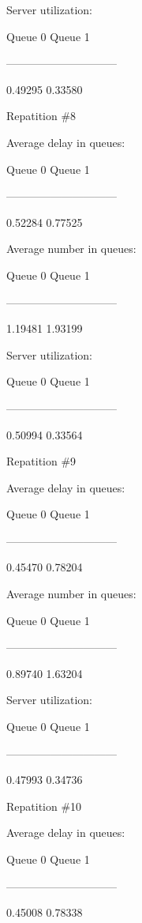 \documentclass{article}
\begin{document}
 Server utilization:
 
 Queue 0		Queue 1
 
 ------------------------------
 
 0.49295		0.33580
 


 Repatition \#8
 



 Average delay in queues:
 
 Queue 0		Queue 1
 
 ------------------------------
 
 0.52284		0.77525
 


 Average number in queues:
 
 Queue 0		Queue 1
 
 ------------------------------
 
 1.19481		1.93199
 


 Server utilization:
 
 Queue 0		Queue 1
 
 ------------------------------
 
 0.50994		0.33564
 


 Repatition \#9



 Average delay in queues:
 
 Queue 0		Queue 1
 
 ------------------------------
 
 0.45470		0.78204
 


 Average number in queues:
 
 Queue 0		Queue 1
 
 ------------------------------
 
0.89740		1.63204		


Server utilization:

Queue 0		Queue 1

------------------------------

0.47993		0.34736



 Repatition \#10



 Average delay in queues:
 
 Queue 0		Queue 1
 
 ------------------------------
 
 0.45008		0.78338
 
\end{document}

